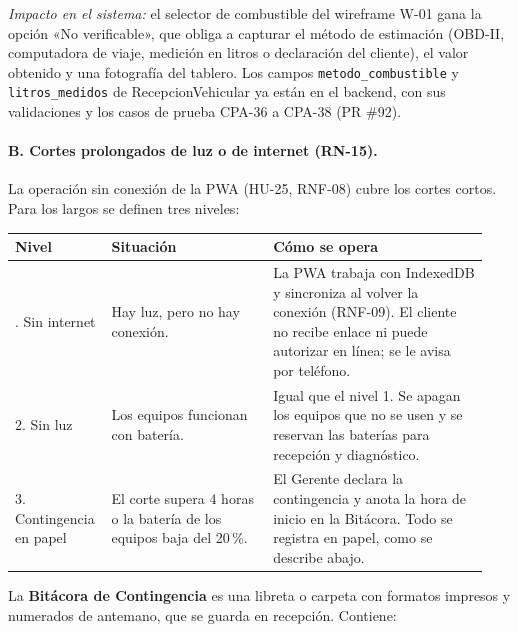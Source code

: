 \emph{Impacto en el sistema:} el selector de combustible del wireframe W-01
gana la opción «No verificable», que obliga a capturar el método de
estimación (OBD-II, computadora de viaje, medición en litros o declaración
del cliente), el valor obtenido y una fotografía del tablero.
Los campos \texttt{metodo\_combustible} y \texttt{litros\_medidos} de
RecepcionVehicular ya están en el backend, con sus validaciones y los casos de
prueba CPA-36 a CPA-38 (PR \#92).

\paragraph{B. Cortes prolongados de luz o de internet (RN-15).}

La operación sin conexión de la PWA (HU-25, RNF-08) cubre los cortes
cortos. Para los largos se definen tres niveles:

{\small
\begin{longtable}{@{}L{0.17\linewidth}L{0.33\linewidth}L{0.44\linewidth}@{}}
\toprule
\textbf{Nivel} & \textbf{Situación} & \textbf{Cómo se opera} \\
\midrule
\endhead
\bottomrule
{}. Sin internet & Hay luz, pero no hay conexión. & La PWA trabaja con
IndexedDB y sincroniza al volver la conexión (RNF-09). El cliente no
recibe enlace ni puede autorizar en línea; se le avisa por teléfono. \\
2. Sin luz & Los equipos funcionan con batería. & Igual que el nivel 1. Se
apagan los equipos que no se usen y se reservan las baterías para
recepción y diagnóstico. \\
3. Contingencia en papel & El corte supera 4 horas o la batería de los
equipos baja del 20\,\%. & El Gerente declara la contingencia y anota la
hora de inicio en la Bitácora. Todo se registra en papel, como se describe
abajo. \\
\end{longtable}
}

La \textbf{Bitácora de Contingencia} es una libreta o carpeta con formatos
impresos y numerados de antemano, que se guarda en recepción. Contiene:

